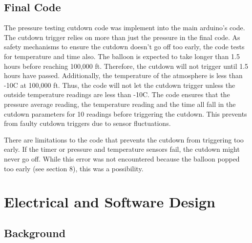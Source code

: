 \documentclass[12pt,]{article}
\begin{document}
\subsection{Final Code}\label{final-code}

The pressure testing cutdown code was implement into the main arduino's
code. The cutdown trigger relies on more than just the pressure in the
final code. As safety mechanisms to ensure the cutdown doesn't go off
too early, the code tests for temperature and time also. The balloon is
expected to take longer than 1.5 hours before reaching 100,000 ft.
Therefore, the cutdown will not trigger until 1.5 hours have passed.
Additionally, the temperature of the atmosphere is less than
-10\degree C at 100,000 ft. Thus, the code will not let the cutdown
trigger unless the outside temperature readings are less than
-10\degree C. The code ensures that the pressure average reading, the
temperature reading and the time all fall in the cutdown parameters for
10 readings before triggering the cutdown. This prevents from faulty
cutdown triggers due to sensor fluctuations.

There are limitations to the code that prevents the cutdown from
triggering too early. If the timer or pressure and temperature sensors
fail, the cutdown might never go off. While this error was not
encountered because the balloon popped too early (see section 8), this
was a possibility.

\section{Electrical and Software
Design}\label{electrical-and-software-design}

\subsection{Background}\label{background-1}
\end{document}
